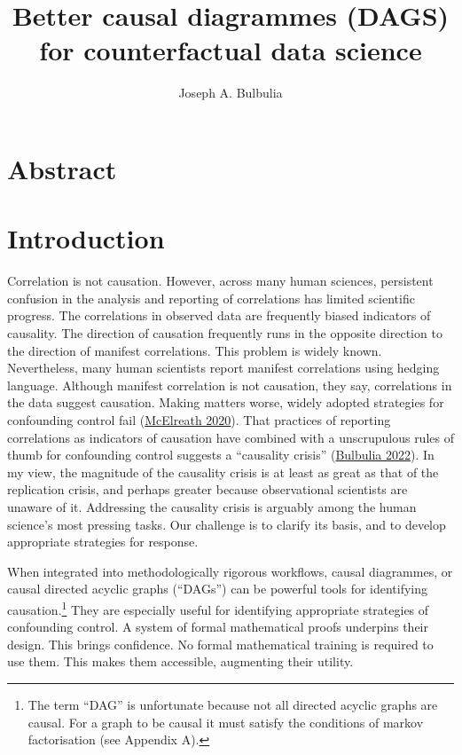 \documentclass[
  singlecolumn]{report}
\title{Better causal diagrammes (DAGS) for counterfactual data science}
\author{Joseph A. Bulbulia}
\date{}
\begin{document}
\maketitle
\ifdefined\Shaded\renewenvironment{Shaded}{\begin{tcolorbox}[interior hidden, borderline west={3pt}{0pt}{shadecolor}, breakable, sharp corners, frame hidden, enhanced, boxrule=0pt]}{\end{tcolorbox}}\fi

\listoffigures
\listoftables
\hypertarget{abstract}{%
\section{Abstract}\label{abstract}}

\hypertarget{introduction}{%
\section{Introduction}\label{introduction}}

Correlation is not causation. However, across many human sciences,
persistent confusion in the analysis and reporting of correlations has
limited scientific progress. The correlations in observed data are
frequently biased indicators of causality. The direction of causation
frequently runs in the opposite direction to the direction of manifest
correlations. This problem is widely known. Nevertheless, many human
scientists report manifest correlations using hedging language. Although
manifest correlation is not causation, they say, correlations in the
data suggest causation. Making matters worse, widely adopted strategies
for confounding control fail
(\protect\hyperlink{ref-mcelreath2020}{McElreath 2020}). That practices
of reporting correlations as indicators of causation have combined with
a unscrupulous rules of thumb for confounding control suggests a
``causality crisis'' (\protect\hyperlink{ref-bulbulia2022}{Bulbulia
2022}). In my view, the magnitude of the causality crisis is at least as
great as that of the replication crisis, and perhaps greater because
observational scientists are unaware of it. Addressing the causality
crisis is arguably among the human science's most pressing tasks. Our
challenge is to clarify its basis, and to develop appropriate strategies
for response.

When integrated into methodologically rigorous workflows, causal
diagrammes, or causal directed acyclic graphs (``DAGs'') can be powerful
tools for identifying causation.\footnote{The term ``DAG'' is
  unfortunate because not all directed acyclic graphs are causal. For a
  graph to be causal it must satisfy the conditions of markov
  factorisation (see Appendix A).} They are especially useful for
identifying appropriate strategies of confounding control. A system of
formal mathematical proofs underpins their design. This brings
confidence. No formal mathematical training is required to use them.
This makes them accessible, augmenting their utility.
\end{document}
